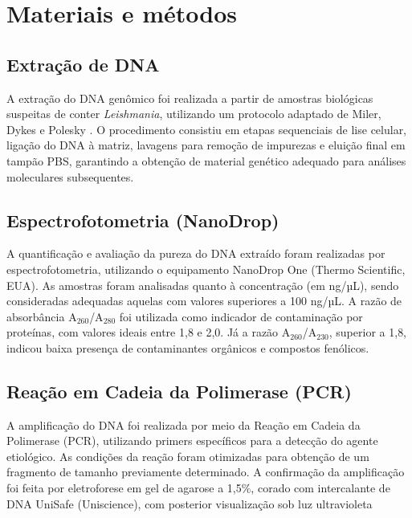 \section{Materiais e métodos}

\subsection{Extração de DNA}

A extração do DNA genômico foi realizada a partir de amostras biológicas suspeitas de conter 
\textit{Leishmania}, utilizando um protocolo adaptado de Miler, Dykes e Polesky \cite{miller1988salting}. 
O procedimento consistiu em etapas sequenciais de lise celular, ligação do DNA à matriz, lavagens para remoção 
de impurezas e eluição final em tampão PBS, garantindo a obtenção de material genético adequado para análises 
moleculares subsequentes.

\subsection{Espectrofotometria (NanoDrop)}

A quantificação e avaliação da pureza do DNA extraído foram realizadas por espectrofotometria, utilizando o 
equipamento NanoDrop One (Thermo Scientific, EUA). As amostras foram analisadas quanto à concentração (em ng/µL), 
sendo consideradas adequadas aquelas com valores superiores a 100 ng/µL. A razão de absorbância A$_{260}$/A$_{280}$ 
foi utilizada como indicador de contaminação por proteínas, com valores ideais entre 1{,}8 e 2{,}0. Já a razão 
A$_{260}$/A$_{230}$, superior a 1{,}8, indicou baixa presença de contaminantes orgânicos e compostos fenólicos.

\subsection{Reação em Cadeia da Polimerase (PCR)}

A amplificação do DNA foi realizada por meio da Reação em Cadeia da Polimerase (PCR), utilizando primers específicos 
para a detecção do agente etiológico. As condições da reação foram otimizadas para obtenção de um fragmento de tamanho 
previamente determinado. A confirmação da amplificação foi feita por eletroforese em gel de agarose a 1,5\%, corado com 
intercalante de DNA UniSafe (Uniscience), com posterior visualização sob luz ultravioleta

